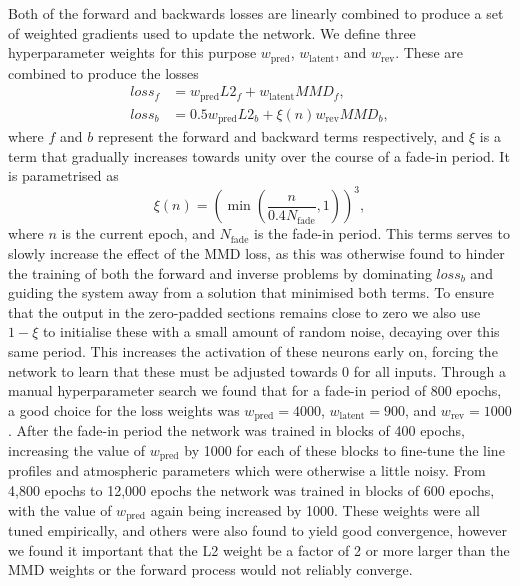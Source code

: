 Both of the forward and backwards losses are linearly combined to produce a set of weighted gradients used to update the network.
We define three hyperparameter weights for this purpose $w_\mathrm{pred}$, $w_\mathrm{latent}$, and $w_\mathrm{rev}$.
These are combined to produce the losses
\begin{align}
    loss_f &= w_\mathrm{pred} L2_f + w_\mathrm{latent} MMD_f,\\
    loss_b &= 0.5w_\mathrm{pred} L2_b + \xi(n)w_\mathrm{rev} MMD_b,
\end{align}
where $f$ and $b$ represent the forward and backward terms respectively, and $\xi$ is a term that gradually increases towards unity over the course of a fade-in period.
It is parametrised as
\begin{equation}
    \xi(n) = \left( \min\left( \frac{n}{0.4 N_\mathrm{fade}}, 1 \right) \right)^3,
\end{equation}
where $n$ is the current epoch, and $N_\mathrm{fade}$ is the fade-in period.
This terms serves to slowly increase the effect of the MMD loss, as this was otherwise found to hinder the training of both the forward and inverse problems by dominating $loss_b$ and guiding the system away from a solution that minimised both terms.
To ensure that the output in the zero-padded sections remains close to zero we also use $1-\xi$ to initialise these with a small amount of random noise, decaying over this same period.
This increases the activation of these neurons early on, forcing the network to learn that these must be adjusted towards 0 for all inputs.
Through a manual hyperparameter search we found that for a fade-in period of 800 epochs, a good choice for the loss weights was $w_\mathrm{pred}=4000$, $w_\mathrm{latent}=900$, and $w_\mathrm{rev}=1000$.
After the fade-in period the network was trained in blocks of 400 epochs, increasing the value of $w_\mathrm{pred}$ by 1000 for each of these blocks to fine-tune the line profiles and atmospheric parameters which were otherwise a little noisy.
From 4,800 epochs to 12,000 epochs the network was trained in blocks of 600 epochs, with the value of $w_\mathrm{pred}$ again being increased by 1000.
These weights were all tuned empirically, and others were also found to yield good convergence, however we found it important that the L2 weight be a factor of 2 or more larger than the MMD weights or the forward process would not reliably converge.

